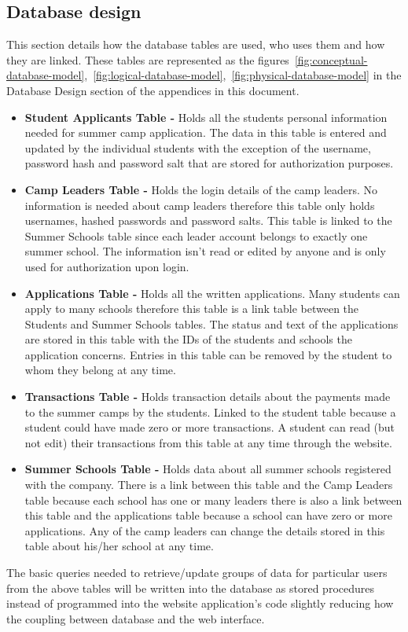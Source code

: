 \documentclass{project}
\begin{document}
\subsection{Database design}
This section details how the database tables are used, who uses them and how they are linked. These tables are represented as the figures~\ref{fig:conceptual-database-model},~\ref{fig:logical-database-model},~\ref{fig:physical-database-model} in the Database Design section of the appendices in this document. 
\begin{itemize}
\item\textbf{Student Applicants Table - }
Holds all the students personal information needed for summer camp application. The data in this table is entered and updated by the individual students with the exception of the username, password hash and password salt that are stored for authorization purposes. 

\item\textbf{Camp Leaders Table -}
Holds the login details of the camp leaders. No information is needed about camp leaders therefore this table only holds usernames, hashed passwords and password salts. This table is linked to the Summer Schools table since each leader account belongs to exactly one summer school. The information isn't read or edited by anyone and is only used for authorization upon login.

\item\textbf{Applications Table -}
Holds all the written applications. Many students can apply to many schools therefore this table is a link table between the Students and Summer Schools tables. The status and text of the applications are stored in this table with the IDs of the students and schools the application concerns. Entries in this table can be removed by the student to whom they belong at any time.

\item\textbf{Transactions Table -}
Holds transaction details about the payments made to the summer camps by the students. Linked to the student table because a student could have made zero or more transactions. A student can read (but not edit) their transactions from this table at any time through the website. 

\item\textbf{Summer Schools Table -}
Holds data about all summer schools registered with the company. There is a link between this table and the Camp Leaders table because each school has one or many leaders there is also a link between this table and the applications table because a school can have zero or more applications. Any of the camp leaders can change the details stored in this table about his/her school at any time. 
\end{itemize}
The basic queries needed to retrieve/update groups of data for particular users from the above tables will be written into the database as stored procedures instead of programmed into the website application's code slightly reducing how the coupling between database and the web interface. 
\newpage
\end{document}
